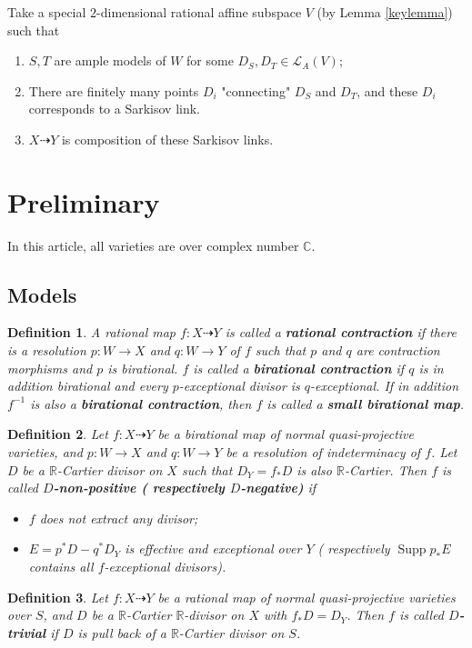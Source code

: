 \documentclass[11pt]{amsart}
\numberwithin{equation}{section}
\newtheorem{defn}{Definition}[subsection]
\begin{document}
Take a special $2$-dimensional rational affine subspace  $V$ (by Lemma \ref{keylemma}) such that 
\begin{enumerate}
  \item $S,T$ are ample models of $W$ for some $D_{S},D_{T} \in \mathcal{L}_{A}(V)$;
  \item  There are finitely many points  $D_{i}$ "connecting" $D_{S}$ and $D_{T}$, and these $D_{i}$ corresponds to a Sarkisov link.
  \item   $X\dashrightarrow Y$ is composition of these Sarkisov links.
\end{enumerate}


\section{Preliminary}
In this article, all varieties are over complex number $\mathbb{C}$.
\subsection{Models}
\begin{defn}
  \cite[2.Notation and Conventions]{haconSarkisovProgram2012} A rational map $f:X\dashrightarrow Y$ is called a \textbf{rational contraction} if there is a resolution $p:W\to X$  and $q:W\to Y$  of $f$  such that $p$  and $q$  are contraction morphisms and $p$  is birational. $f$ is called a \textbf{birational contraction} if $q$  is in addition birational and every $p$-exceptional divisor is $q$-exceptional. If in addition $f^{-1}$ is also a \textbf{birational contraction}, then $f$ is called a \textbf{small birational map}.
\end{defn}

\begin{defn}\label{negativemap}
  \cite[Definition 3.6.1]{birkarExistenceMinimalModels2009}Let $f:X\dashrightarrow Y$ be a birational map of normal quasi-projective varieties, and $p:W\to X$ and $q:W\to Y$ be a resolution of indeterminacy of $f$. Let $D$ be a $\mathbb{R}$-Cartier divisor on $X$ such that  $D_{Y}=f_*D$ is  also $\mathbb{R}$-Cartier. Then $f$ is called \textbf{$D$-non-positive ( respectively $D$-negative)} if
\begin{itemize}
  \item $f$ does not extract any divisor;
  \item $E=p^{*}D-q^*D_Y$ is effective and exceptional over $Y$ ( respectively $\operatorname{Supp}p_*E$ contains all $f$-exceptional divisors).
\end{itemize}
\end{defn}
\begin{defn}\label{trivialmap}
  \cite[13.2.Notation and conventions]{haconMinimalModelProgram2012} Let $f:X\dashrightarrow Y$ be a rational map of normal quasi-projective varieties over $S$, and $D$ be a $\mathbb{R}$-Cartier $\mathbb{R}$-divisor  on $X$ with $f_*D=D_Y$. Then $f$ is called \textbf{$D$-trivial} if $D$ is pull back of a $\mathbb{R}$-Cartier divisor on $S$.
\end{defn}
\end{document}
